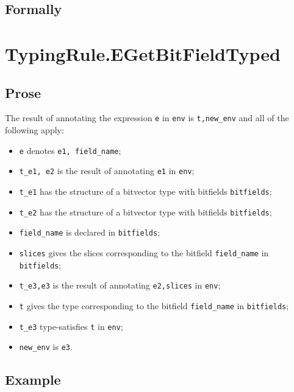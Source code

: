\documentclass{book}
\begin{document}
\begin{emptyformal}
    \subsection{Formally}
\end{emptyformal}


\section{TypingRule.EGetBitFieldTyped \label{sec:TypingRule.EGetBitFieldTyped}}

  \subsection{Prose}
  The result of annotating the expression \texttt{e} in \texttt{env} is
\texttt{t,new\_env} and all of the following apply:
  \begin{itemize}
  \item \texttt{e} denotes \texttt{e1, field\_name};
  \item \texttt{t\_e1, e2} is the result of annotating \texttt{e1} in \texttt{env};
  \item \texttt{t\_e1} has the structure of a bitvector type with bitfields \texttt{bitfields};
  \item \texttt{t\_e2} has the structure of a bitvector type with bitfields \texttt{bitfields};
  \item \texttt{field\_name} is declared in \texttt{bitfields};
  \item \texttt{slices} gives the slices corresponding to the bitfield \texttt{field\_name} in
    \texttt{bitfields};
  \item \texttt{t\_e3,e3} is the result of annotating \texttt{e2,slices} in \texttt{env};
  \item \texttt{t} gives the type corresponding to the bitfield \texttt{field\_name} in \texttt{bitfields};
  \item \texttt{t\_e3} type-satisfies \texttt{t} in \texttt{env};
  \item \texttt{new\_env} is \texttt{e3}.
  \end{itemize}

  \subsection{Example}
\end{document}
